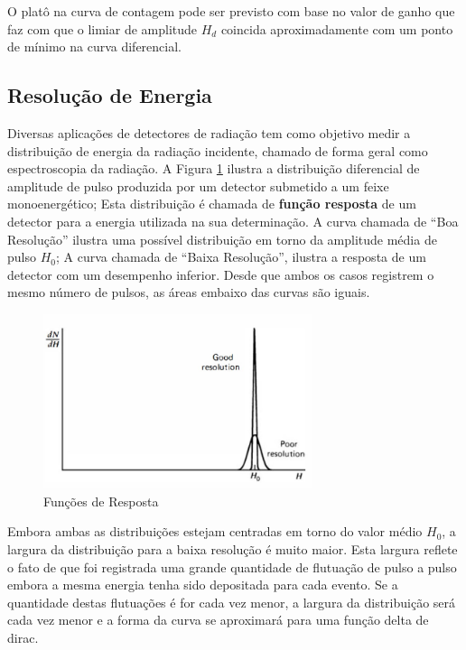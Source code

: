\documentclass[11pt,a4paper]{article}
\begin{document}
		O platô na curva de contagem pode ser previsto com base no valor de ganho que faz com que o limiar de amplitude $H_d$ coincida aproximadamente com um ponto de mínimo na curva diferencial. 


	\subsection{Resolução de Energia}

		Diversas aplicações de detectores de radiação tem como objetivo medir a distribuição de energia da radiação incidente, chamado de forma geral como espectroscopia da radiação. A Figura \ref{fig:funcoesDeResposta} ilustra a distribuição diferencial de amplitude de pulso produzida por um detector submetido a um feixe monoenergético; Esta distribuição é chamada de \textbf{função resposta} de um detector para a energia utilizada na sua determinação. A curva chamada de ``Boa Resolução'' ilustra uma possível distribuição em torno da amplitude média de pulso $H_0$; A curva chamada de ``Baixa Resolução'', ilustra a resposta de um detector com um desempenho inferior. Desde que ambos os casos registrem o mesmo número de pulsos, as áreas embaixo das curvas são iguais.

		\begin{figure}[h]
			\centering
			\includegraphics[width=0.7\textwidth]{Imagens/funcoesDeResposta.jpg}
			\caption{Funções de Resposta}
			\label{fig:funcoesDeResposta}
		\end{figure}

		Embora ambas as distribuições estejam centradas em torno do valor médio $H_0$, a largura da distribuição para a baixa resolução é muito maior. Esta largura reflete o fato de que foi registrada uma grande quantidade de flutuação de pulso a pulso embora a mesma energia tenha sido depositada para cada evento. Se a quantidade destas flutuações é for cada vez menor, a largura da distribuição será cada vez menor e a forma da curva se aproximará para uma função delta de dirac. 
\end{document}
